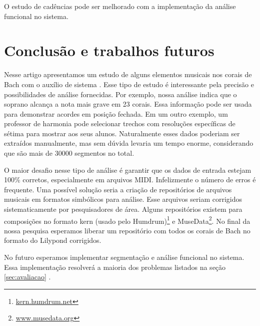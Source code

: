 O estudo de cadências pode ser melhorado com a implementação da
análise funcional no sistema. 

\section{Conclusão e trabalhos futuros}
\label{sec:concl-e-trab}

Nesse artigo apresentamos um estudo de alguns elementos musicais nos
corais de Bach com o auxílio de sistema \rameau{}. Esse tipo de estudo
é interessante pela precisão e possibilidades de análise fornecidas.
Por exemplo, nossa análise indica que o soprano alcança a nota mais
grave em 23 corais. Essa informação pode ser usada para demonstrar
acordes em posição fechada. Em um outro exemplo, um professor de
harmonia pode selecionar trechos com resoluções específicas de sétima
para mostrar aos seus alunos. Naturalmente esses dados poderiam ser
extraídos manualmente, mas sem dúvida levaria um tempo enorme,
considerando que são mais de 30000 segmentos no total.

O maior desafio nesse tipo de análise é garantir que os dados de
entrada estejam 100\% corretos, especialmente em arquivos MIDI.
Infelizmente o número de erros é frequente. Uma possível solução seria
a criação de repositórios de arquivos musicais em formatos simbólicos
para análise. Esse arquivos seriam corrigidos sistematicamente por
pesquisadores de área. Alguns repositórios existem para composições no
formato kern (usado pelo Humdrum)\footnote{\url{kern.humdrum.net}} e
MuseData\footnote{\url{www.musedata.org}}. No final da nossa pesquisa
esperamos liberar um repositório com todos os corais de Bach no
formato do Lilypond corrigidos.

No futuro esperamos implementar segmentação e análise funcional no
sistema. Essa implementação resolverá a maioria dos problemas listados
na seção \ref{sec:avaliacao} .

